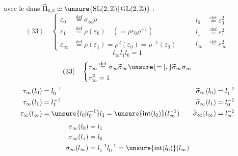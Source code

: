 avec le  dans $\widetilde\Pi_{0,3}\simeq\unsure{\operatorname{SL}(2,\mathbb Z)|\operatorname{GL}(2,\mathbb Z)}$ :
\[
(33)\quad\left\{\begin{aligned}
\varepsilon_0&\overset{\mathrm{def}}=\sigma_\infty\rho\\
\varepsilon_1&\overset{\mathrm{def}}=\rho(\varepsilon_0)\quad(=\rho\varepsilon_0\rho^{-1})\\
\varepsilon_\infty&\overset{\mathrm{def}}=\rho(\varepsilon_1)=\rho^2(\varepsilon_0)=\rho^{-1}(\varepsilon_0)
\end{aligned}\right.
\qquad
\begin{aligned}
l_0&\overset{\mathrm{def}}=\varepsilon_0^2\\
l_1&\overset{\mathrm{def}}=\varepsilon_1^2\\
l_\infty&\overset{\mathrm{def}}=\varepsilon_\infty^2
\end{aligned}
\]
\[
l_\infty l_1l_0=1
\]
\[
(33)\quad\left\{\begin{aligned}
\tau_\infty&\overset{\mathrm{def}}=\sigma_\infty\widetilde\sigma_\infty\unsure{=|,}\widetilde\sigma_\infty\sigma_\infty\\
\tau_\infty^2&=1
\end{aligned}\right.
\]
\[
\begin{aligned}
\tau_\infty(l_0)&=l_0^{-1}\\
\tau_\infty(l_1)&=l_1^{-1}\\
\tau_\infty(l_\infty)&=\unsure{l_0|l_0^{-1}}l_1=\unsure{\operatorname{int}(l_0)}(l_\infty^{-1})
\end{aligned}
\qquad
\begin{aligned}
\widetilde\sigma_\infty(l_0)&=l_1^{-1}\\
\widetilde\sigma_\infty(l_1)&=l_0^{-1}\\
\widetilde\sigma_\infty(l_\infty)&=l_\infty^{-1}
\end{aligned}
\]
\[
\begin{aligned}
\sigma_\infty(l_0)&=l_1\\
\sigma_\infty(l_1)&=l_0\\
\sigma_\infty(l_\infty)&=l_1^{-1}l_0^{-1}=\unsure{\operatorname{int}(l_0)}(l_\infty)
\end{aligned}
\]
